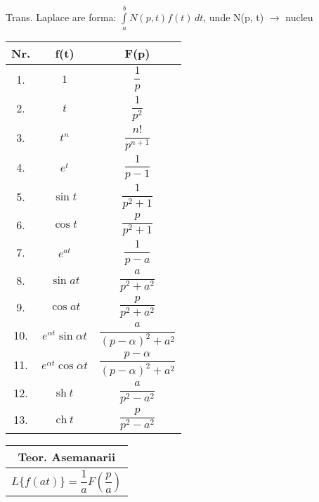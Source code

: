 \documentclass{article}
\begin{document}
\setlength{\extrarowheight}{10pt}

\noindent

Trans. Laplace are forma: $\displaystyle\int\limits_{a}^{b} N(p, t) f(t)\,dt$, unde N(p, t) $\rightarrow$ nucleu\\
\hspace*{-3cm} %
\begin{minipage}{\dimexpr\textwidth+2cm}
  \begin{tabular}{|c|c|c|}
    \hline
    \textbf{Nr.} & \textbf{f(t)}                  & \textbf{F(p)}                          \\
    \hline
    1.           & $ 1 $                          & $ \dfrac{1}{p} $                       \\
    \hline
    2.           & $ t $                          & $ \dfrac{1}{p^2} $                     \\
    \hline
    3.           & $ t^n $                        & $ \dfrac{n!}{p^{n+1}} $                \\
    \hline
    4.           & $ e^t $                        & $ \dfrac{1}{p-1} $                     \\
    \hline
    5.           & $ \sin t $                     & $ \dfrac{1}{p^2+1} $                   \\
    \hline
    6.           & $ \cos t $                     & $ \dfrac{p}{p^2+1} $                   \\
    \hline
    7.           & $ e^{at} $                     & $ \dfrac{1}{p-a} $                     \\
    \hline
    8.           & $ \sin at $                    & $ \dfrac{a}{p^2+a^2}  $                \\
    \hline
    9.           & $ \cos at $                    & $ \dfrac{p}{p^2+a^2} $                 \\
    \hline
    10.          & $ e^{\alpha t} \sin \alpha t $ & $ \dfrac{a}{(p-\alpha)^2+a^2} $        \\
    \hline
    11.          & $ e^{\alpha t} \cos \alpha t $ & $ \dfrac{p-\alpha}{(p-\alpha)^2+a^2} $ \\
    \hline
    12.          & $ \text{sh}\ t $               & $ \dfrac{a}{p^2-a^2} $                 \\
    \hline
    13.          & $ \text{ch}\ t $               & $ \dfrac{p}{p^2-a^2} $                 \\
    \hline
  \end{tabular}
  \begin{tabular}{|c|}
    \hline
    \textbf{Teor. Asemanarii}                                \\
    \hline
    $ L\{f(at)\} = \dfrac{1}{a} F\left(\dfrac{p}{a}\right) $ \\
    \hline
  \end{tabular}


\end{minipage}
\end{document}
